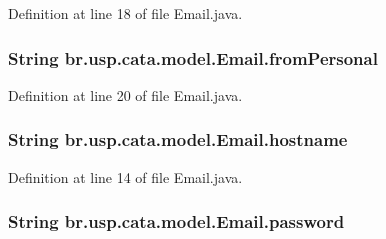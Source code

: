 Definition at line 18 of file Email.\+java.

\hypertarget{classbr_1_1usp_1_1cata_1_1model_1_1_email_a1b531f2c52d506121d3b17e04aeebca7}{
\subsubsection[{from\+Personal}]{\setlength{\rightskip}{0pt plus 5cm}String br.\+usp.\+cata.\+model.\+Email.\+from\+Personal\hspace{0.3cm}{\ttfamily [private]}}}\label{classbr_1_1usp_1_1cata_1_1model_1_1_email_a1b531f2c52d506121d3b17e04aeebca7}


Definition at line 20 of file Email.\+java.

\hypertarget{classbr_1_1usp_1_1cata_1_1model_1_1_email_ac7c7a138711655396f5ff6784f9fa720}{
\subsubsection[{hostname}]{\setlength{\rightskip}{0pt plus 5cm}String br.\+usp.\+cata.\+model.\+Email.\+hostname\hspace{0.3cm}{\ttfamily [private]}}}\label{classbr_1_1usp_1_1cata_1_1model_1_1_email_ac7c7a138711655396f5ff6784f9fa720}


Definition at line 14 of file Email.\+java.

\hypertarget{classbr_1_1usp_1_1cata_1_1model_1_1_email_a33ee916dcfa41c830317e93ce3a68c3e}{
\subsubsection[{password}]{\setlength{\rightskip}{0pt plus 5cm}String br.\+usp.\+cata.\+model.\+Email.\+password\hspace{0.3cm}{\ttfamily [private]}}}\label{classbr_1_1usp_1_1cata_1_1model_1_1_email_a33ee916dcfa41c830317e93ce3a68c3e}


